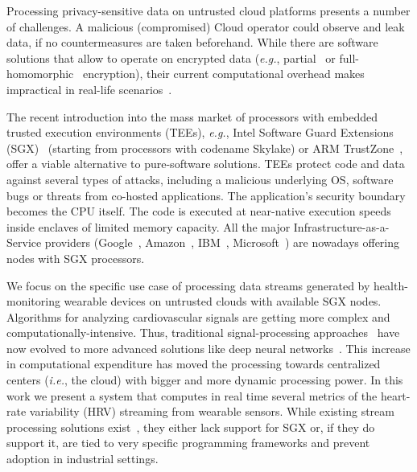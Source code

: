 Processing privacy-sensitive data on untrusted cloud platforms presents a number of challenges.
A malicious (compromised) Cloud operator could observe and leak data, if no countermeasures are taken beforehand.
While there are software solutions that allow to operate on encrypted data (\emph{e.g.}, partial~\cite{Paillier1999} or full-homomorphic~\cite{Gentry2012} encryption), their current computational overhead makes  impractical in real-life scenarios~\cite{Gottel2018S}.

The recent introduction into the mass market of processors with embedded trusted execution environments (TEEs), \emph{e.g.}, Intel Software Guard Extensions (SGX)~\cite{Costan2016} (starting from processors with codename Skylake) or ARM TrustZone~\cite{trustzone}, offer a viable alternative to pure-software solutions.
TEEs protect code and data against several types of attacks, including a malicious underlying OS, software bugs or threats from co-hosted applications.
The application's security boundary becomes the CPU itself.
The code is executed at near-native execution speeds inside enclaves of limited memory capacity.
All the major Infrastructure-as-a-Service providers (Google~\cite{gceskylake}, Amazon~\cite{amazonskylake}, IBM~\cite{ibm-sgx}, Microsoft~\cite{azureconfidential}) are nowadays offering nodes with SGX processors.

We focus on the specific use case of processing data streams generated by health-monitoring wearable devices on untrusted clouds with available SGX nodes.
Algorithms for analyzing cardiovascular signals are getting more complex and computationally-intensive.
Thus, traditional signal-processing approaches~\cite{Kumar2016} have now evolved to more advanced solutions like deep neural networks~\cite{Xiong2018,VanZaen2019}.
This increase in computational expenditure has moved the processing towards centralized centers (\textit{i.e.}, the cloud) with bigger and more dynamic processing power. %
In this work we present a system that computes in real time several metrics of the heart-rate variability (HRV) streaming from wearable sensors.
While existing stream processing solutions exist~\cite{spark-streaming-documentation,Havet2017}, they either lack support for SGX or, if they do support it, are tied to very specific programming frameworks and prevent adoption in industrial settings.

